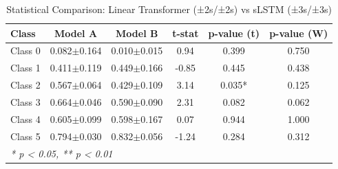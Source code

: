 \begin{table}[htbp]
\centering
\caption{Statistical Comparison: Linear Transformer (±2s/±2s) vs sLSTM (±3s/±3s)}
\label{tab:comparison_class_linear_transformer_±2s_±2s_vs_slstm_±3s_±3s}
\begin{tabular}{lccccc}
\toprule
\textbf{Class} & \textbf{Model A} & \textbf{Model B} & \textbf{t-stat} & \textbf{p-value (t)} & \textbf{p-value (W)} \\
\midrule
Class 0 & 0.082$\pm$0.164 & 0.010$\pm$0.015 & 0.94 & 0.399 & 0.750 \\
Class 1 & 0.411$\pm$0.119 & 0.449$\pm$0.166 & -0.85 & 0.445 & 0.438 \\
Class 2 & 0.567$\pm$0.064 & 0.429$\pm$0.109 & 3.14 & 0.035* & 0.125 \\
Class 3 & 0.664$\pm$0.046 & 0.590$\pm$0.090 & 2.31 & 0.082 & 0.062 \\
Class 4 & 0.605$\pm$0.099 & 0.598$\pm$0.167 & 0.07 & 0.944 & 1.000 \\
Class 5 & 0.794$\pm$0.030 & 0.832$\pm$0.056 & -1.24 & 0.284 & 0.312 \\
\bottomrule
\multicolumn{6}{l}{\textit{* p < 0.05, ** p < 0.01}} \\
\end{tabular}
\end{table}